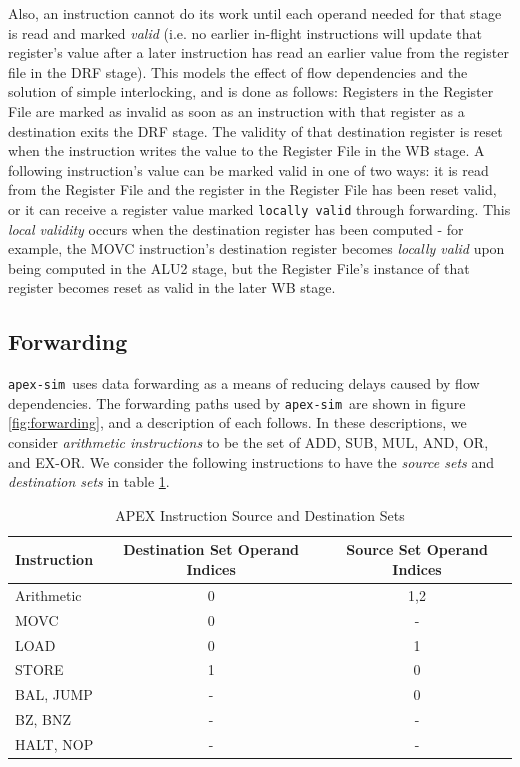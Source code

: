 \documentclass[12pt]{article}
\newcommand{\codename}[0]{\texttt{apex-sim}~}
\begin{document}
Also, an instruction cannot do its work until each operand needed for that stage is read and marked \textit{valid} (i.e. no earlier in-flight instructions will update that register's value after a later instruction has read an earlier value from the register file in the DRF stage).
This models the effect of flow dependencies and the solution of simple interlocking, and is done as follows:
Registers in the Register File are marked as invalid as soon as an instruction with that register as a destination exits the DRF stage.
The validity of that destination register is reset when the instruction writes the value to the Register File in the WB stage.
A following instruction's value can be marked valid in one of two ways: it is read from the Register File and the register in the Register File has been reset valid, or it can receive a register value marked \texttt{locally valid} through forwarding.
This \textit{local validity} occurs when the destination register has been computed - for example, the MOVC instruction's destination register becomes \textit{locally valid} upon being computed in the ALU2 stage, but the Register File's instance of that register becomes reset as valid in the later WB stage.

\subsection{Forwarding}
\label{sec:forwarding}
\codename uses data forwarding as a means of reducing delays caused by flow dependencies.
The forwarding paths used by \codename are shown in figure \ref{fig:forwarding}, and a description of each follows. In these descriptions, we consider \textit{arithmetic instructions} to be the set of ADD, SUB, MUL, AND, OR, and EX-OR. We consider the following instructions to have the \textit{source sets} and \textit{destination sets} in table \ref{tab:instsets}.

\begin{table}
  \centering
  \caption{APEX Instruction Source and Destination Sets}
  \label{tab:instsets}
  \begin{tabular}{l|c|c}
    Instruction & Destination Set Operand Indices & Source Set Operand Indices\\
    \hline
    Arithmetic					 	& 0 & 1,2\\
    MOVC 							& 0 & - \\
    LOAD							& 0 & 1 \\
    STORE							& 1 & 0 \\
    BAL, JUMP						& - & 0 \\
    BZ, BNZ 						& - & - \\
    HALT, NOP						& - & - \\
  \end{tabular}
\end{table}
\end{document}
